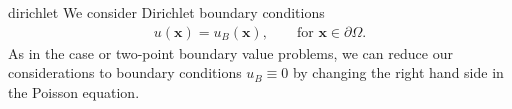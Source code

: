 \begin{Example}{dirichlet}
  We consider Dirichlet boundary conditions
  \begin{gather}
    \label{eq:dirichlet:1}
    u(\mathbf x) = u_B(\mathbf x), \qquad
    \text{for } \mathbf x\in \partial\Omega.
  \end{gather}
  As in the case or two-point boundary value problems, we can reduce
  our considerations to  boundary conditions
  $u_B\equiv 0$ by changing the right hand side in the Poisson
  equation.
\end{Example}

